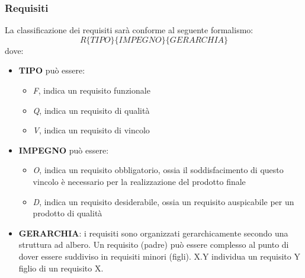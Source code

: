 \subsubsection{Requisiti}
\label{3.2.2}
La classificazione dei requisiti sarà conforme al seguente formalismo:
\[R\{TIPO\}\{IMPEGNO\}\{GERARCHIA\}\]
dove:
\begin{itemize}
\item\textbf{TIPO} può essere:
	\begin{itemize}
	\item\emph{F}, indica un requisito funzionale
	\item\emph{Q}, indica un requisito di qualità
	\item\emph{V}, indica un requisito di vincolo
	\end{itemize}
\item\textbf{IMPEGNO} può essere:
	\begin{itemize}
	\item\emph{O}, indica un requisito obbligatorio, ossia il soddisfacimento di questo vincolo è necessario per la realizzazione del prodotto finale
	\item\emph{D}, indica un requisito desiderabile, ossia un requisito auspicabile per un prodotto di qualità
	\end{itemize}
\item\textbf{GERARCHIA}: i requisiti sono organizzati gerarchicamente secondo una struttura ad albero. Un requisito (padre) può essere complesso al punto di dover essere suddiviso in requisiti minori (figli). X.Y individua un requisito Y figlio di un requisito X.
\end{itemize}


